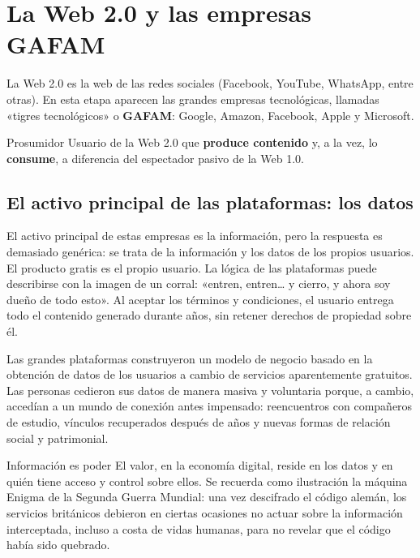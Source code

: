 \documentclass[12pt,oneside]{book}
\begin{document}
\section{La Web 2.0 y las empresas GAFAM}

La Web 2.0 es la web de las redes sociales (Facebook, YouTube, WhatsApp, entre otras). En esta etapa aparecen las grandes empresas tecnológicas, llamadas «tigres tecnológicos» o \textbf{GAFAM}: Google, Amazon, Facebook, Apple y Microsoft.

\begin{definition}{Prosumidor}
Usuario de la Web 2.0 que \textbf{produce contenido} y, a la vez, lo \textbf{consume}, a diferencia del espectador pasivo de la Web 1.0.
\end{definition}

\subsection{El activo principal de las plataformas: los datos}

El activo principal de estas empresas es la información, pero la respuesta es demasiado genérica: se trata de la información y los datos de los propios usuarios. El producto gratis es el propio usuario. La lógica de las plataformas puede describirse con la imagen de un corral: «entren, entren\ldots{} y cierro, y ahora soy dueño de todo esto». Al aceptar los términos y condiciones, el usuario entrega todo el contenido generado durante años, sin retener derechos de propiedad sobre él.

\begin{important}
Las grandes plataformas construyeron un modelo de negocio basado en la obtención de datos de los usuarios a cambio de servicios aparentemente gratuitos. Las personas cedieron sus datos de manera masiva y voluntaria porque, a cambio, accedían a un mundo de conexión antes impensado: reencuentros con compañeros de estudio, vínculos recuperados después de años y nuevas formas de relación social y patrimonial.
\end{important}

\begin{concept}{Información es poder}
El valor, en la economía digital, reside en los datos y en quién tiene acceso y control sobre ellos. Se recuerda como ilustración la máquina Enigma de la Segunda Guerra Mundial: una vez descifrado el código alemán, los servicios británicos debieron en ciertas ocasiones no actuar sobre la información interceptada, incluso a costa de vidas humanas, para no revelar que el código había sido quebrado.
\end{concept}
\end{document}
